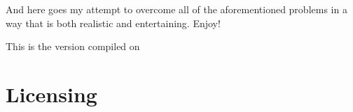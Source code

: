 And here goes my attempt to overcome all of the aforementioned problems in a way that is both realistic and entertaining. Enjoy!


This is the version compiled on \DTMToday\ \DTMcurrenttime

\section*{Licensing}

\pdforepub{
	
\doclicenseThis

\hspace*{\fill} \qrcode[nolink,level=L,height=3cm]{\doclicenseURL}

}{\doclicenseLongText}